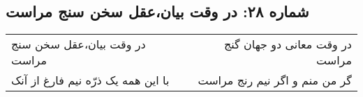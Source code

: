 \begin{center}
\section*{شماره ۲۸: در وقت بیان،‌عقل سخن سنج مراست}
\label{sec:028}
\begin{longtable}{l p{0.5cm} r}
در وقت بیان،‌عقل سخن سنج مراست
&&
در وقت معانی دو جهان گنج مراست
\\
با این همه یک ذرّه نیم فارغ از آنک
&&
گر من منم و اگر نیم رنج مراست
\\
\end{longtable}
\end{center}
